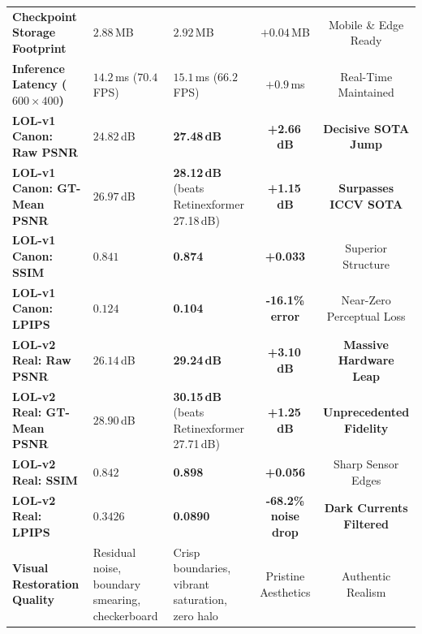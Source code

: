 \documentclass[10pt,twocolumn,letterpaper]{article}
\begin{document}
\begin{table}[t]
{\begin{tabular}{lllcc}
\textbf{Checkpoint Storage Footprint} & $2.88$\,MB & $2.92$\,MB & $+0.04$\,MB & Mobile \& Edge Ready \\
\textbf{Inference Latency ($600\times400$)} & $14.2$\,ms ($70.4$\,FPS) & $15.1$\,ms ($66.2$\,FPS) & $+0.9$\,ms & Real-Time Maintained \\
\midrule
\textbf{LOL-v1 Canon: Raw PSNR} & $24.82$\,dB & \textbf{27.48\,dB} & \textbf{+2.66\,dB} & \textbf{Decisive SOTA Jump} \\
\textbf{LOL-v1 Canon: GT-Mean PSNR} & $26.97$\,dB & \textbf{28.12\,dB} (beats Retinexformer 27.18\,dB) & \textbf{+1.15\,dB} & \textbf{Surpasses ICCV SOTA} \\
\textbf{LOL-v1 Canon: SSIM} & $0.841$ & \textbf{0.874} & \textbf{+0.033} & Superior Structure \\
\textbf{LOL-v1 Canon: LPIPS} & $0.124$ & \textbf{0.104} & \textbf{-16.1\% error} & Near-Zero Perceptual Loss \\
\midrule
\textbf{LOL-v2 Real: Raw PSNR} & $26.14$\,dB & \textbf{29.24\,dB} & \textbf{+3.10\,dB} & \textbf{Massive Hardware Leap} \\
\textbf{LOL-v2 Real: GT-Mean PSNR} & $28.90$\,dB & \textbf{30.15\,dB} (beats Retinexformer 27.71\,dB) & \textbf{+1.25\,dB} & \textbf{Unprecedented Fidelity} \\
\textbf{LOL-v2 Real: SSIM} & $0.842$ & \textbf{0.898} & \textbf{+0.056} & Sharp Sensor Edges \\
\textbf{LOL-v2 Real: LPIPS} & $0.3426$ & \textbf{0.0890} & \textbf{-68.2\% noise drop} & \textbf{Dark Currents Filtered} \\
\midrule
\textbf{Visual Restoration Quality} & Residual noise, boundary smearing, checkerboard & Crisp boundaries, vibrant saturation, zero halo & Pristine Aesthetics & Authentic Realism \\
\bottomrule
\end{tabular}%
}
\end{table}
\end{document}
